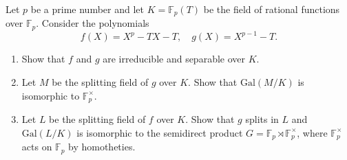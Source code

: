 \begin{exercise}
\label{algebra:2017:9}
Let $p$ be a prime number and let $K = \mathbb{F}_p(T)$ be the field of rational functions over $\mathbb{F}_p$. Consider the polynomials
\[
f(X) = X^p - TX - T, \quad g(X) = X^{p-1} - T.
\]
\begin{enumerate}
    \item Show that $f$ and $g$ are irreducible and separable over $K$.
    \item Let $M$ be the splitting field of $g$ over $K$. Show that $\mathrm{Gal}(M/K)$ is isomorphic to $\mathbb{F}_p^\times$.
    \item Let $L$ be the splitting field of $f$ over $K$. Show that $g$ splits in $L$ and $\mathrm{Gal}(L/K)$ is isomorphic to the semidirect product $G = \mathbb{F}_p \rtimes \mathbb{F}_p^\times$, where $\mathbb{F}_p^\times$ acts on $\mathbb{F}_p$ by homotheties.
\end{enumerate}
\end{exercise}
